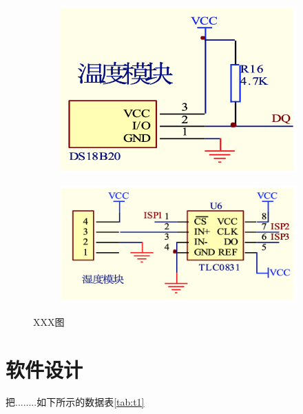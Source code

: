 \documentclass{thxythesis}
\begin{document}
\begin{figure}[!h]
    \begin{subfigure}{0.45\linewidth}
        \includegraphics[scale=0.6]{static/1.png}
        \label{fig:sub-1}
    \end{subfigure}
    \begin{subfigure}{0.5\linewidth}
        \includegraphics[scale=0.6]{static/2.png}
        \label{fig:sub-2}
    \end{subfigure}
    \centerline{}
    \caption{XXX图}
    \label{fig:circuit-diagram}
\end{figure}

\chapter{软件设计}

把........如下所示的数据表\ref{tab:t1}
\end{document}
